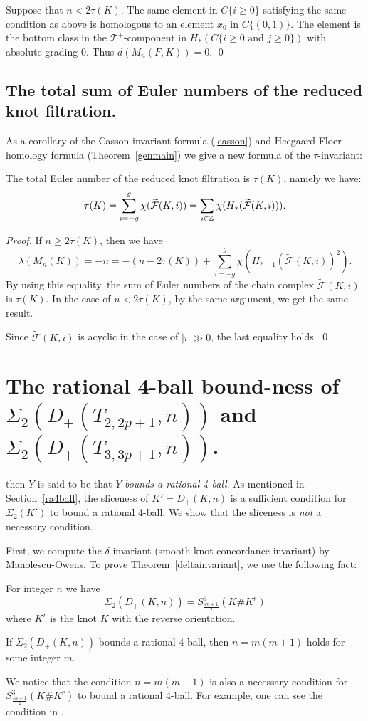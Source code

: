 \documentclass[11pt]{amsart}
\begin{document}
Suppose that $n<2\tau(K)$.
The same element in $C\{i\ge 0\}$ satisfying the same condition as above is homologous to an element $x_0$ in $C\{(0,1)\}$.
The element is the bottom class in the ${\mathcal T}^+$-component in $H_\ast(C\{i\ge 0\text{ and }j\ge 0\})$ with absolute grading $0$.
Thus $d(M_n(F,K))=0$.
\hfill\qed

\subsection{The total sum of Euler numbers of the reduced knot filtration.}
As a corollary of the Casson invariant formula (\ref{casson}) and Heegaard Floer homology formula (Theorem~\ref{genmain}) we give a new formula of the $\tau$-invariant:
\begin{cor}
\label{filtEul}
The total Euler number of the reduced knot filtration is $\tau(K)$, namely we have:
$$\tau(K)=\sum_{i=-g}^g\chi(\widetilde{\mathcal F}(K,i))=\sum_{i\in {\Bbb Z}}\chi(H_\ast(\widetilde{\mathcal F}(K,i))).$$
\end{cor}
\begin{proof}
If $n\ge 2\tau(K)$, then we have
$$\lambda(M_n(K))=-n=-(n-2\tau(K))+\sum_{i=-g}^g\chi(H_{\ast+1}(\widetilde{\mathcal F}(K,i))^2).$$
By using this equality, the sum of Euler numbers of the chain complex $\widetilde{\mathcal F}(K,i)$ is $\tau(K)$.
In the case of $n<2\tau(K)$, by the same argument, we get the same result.

Since $\widetilde{{\mathcal F}}(K,i)$ is acyclic in the case of $|i|\gg 0$, the last equality holds.
\qed\end{proof}

\section{The rational 4-ball bound-ness of $\Sigma_2(D_+(T_{2,2p+1},n))$ and $\Sigma_2(D_+(T_{3,3p+1},n))$.}
then $Y$ is said to be that $Y$ {\it bounds a rational 4-ball}.
As mentioned in Section~\ref{ra4ball}, the sliceness of $K'=D_+(K,n)$ is a sufficient condition for $\Sigma_2(K')$
to bound a rational 4-ball.
We show that the sliceness is {\it not} a necessary condition.

First, we compute the $\delta$-invariant (smooth knot concordance invariant) by Manolescu-Owens.
To prove Theorem~\ref{deltainvariant}, we use the following fact:
\begin{prop}
\label{4n+12KK}
For integer $n$ we have
$$\Sigma_2(D_+(K,n))=S^3_{\frac{4n+1}2}(K\#K^r)$$
where $K^r$ is the knot $K$ with the reverse orientation.

If $\Sigma_2(D_+(K,n))$ bounds a rational 4-ball, then $n=m(m+1)$ holds for some integer $m$.
\end{prop}
We notice that the condition $n=m(m+1)$ is also a necessary condition for $S^3_{\frac{4n+1}{2}}(K\#K^r)$ to bound
a rational 4-ball.
For example, one can see the condition in \cite{CG}.
\end{document}

